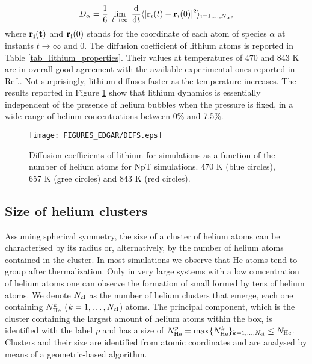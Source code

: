 \documentclass[jcp,amsmath,amssymb,preprint]{revtex4-1}
\begin{document}
 \begin{equation}
 D_\alpha = \frac{1}{6}\;\lim_{t\rightarrow \infty}\;\frac{{\rm d}}{{\rm d}t}
                \langle|{\bf r}_i(t)- {\bf r}_i(0)|^2\rangle_{i = 1, ..., N_\alpha},
            \label{eq_einstein}
 \end{equation}
where ${\bf r_i(t)}$ and ${\bf r_i}(0)$ stands for the coordinate of each atom of species $\alpha$ at instants $t\rightarrow\infty$ and 0.  The diffusion coefficient of lithium atoms is reported in Table \ref{tab_lithium_properties}. Their values at temperatures of 470 and 843 K are in overall good agreement with the available experimental ones reported in Ref.\cite{canales1994computer}. 
Not surprisingly,  lithium diffuses faster as the temperature increases. The results reported in Figure \ref{fig:diffusion} show that lithium dynamics is essentially independent of the presence of helium bubbles when the pressure is fixed, in a wide range of helium concentrations between 0\% and 7.5\%. 

\begin{figure}
    \centering
    \texttt{[image: FIGURES\_EDGAR/DIFS.eps]}
    \caption{Diffusion coefficients of lithium for simulations as a function of the number of helium atoms for NpT simulations. 470 K (blue circles), 657 K (gree circles) and 843 K (red circles).}
    \label{fig:diffusion}
\end{figure}

\subsection{\label{size} Size of helium clusters}

Assuming spherical symmetry, the size of a cluster of helium atoms can be characterised by its radius or, alternatively, by the number of helium atoms contained in the cluster. In most simulations we observe that He atoms tend to group after thermalization.  Only in very large systems with a low concentration of helium atoms one can observe the formation of small formed by tens of helium atoms.  We denote $N_{\rm cl}$ as the number of helium clusters that emerge, each one containing $N_{\rm He}^k$ ($k = 1, \dots, N_{\rm cl}$) atoms. The principal component, which is the cluster containing the largest amount of helium atoms within the box, is identified with the label $p$ and has a size of $N_{\rm He}^p = \max\{N_{\rm He}^k\}_{k = 1, \dots, N_{\rm cl}} \leq N_{\rm He}$.  Clusters and their size are identified from atomic coordinates and are analysed by means of a geometric-based algorithm. 
\end{document}
